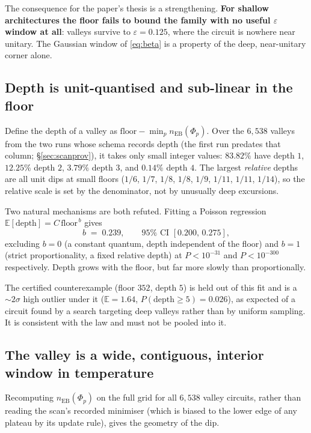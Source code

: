 \documentclass[11pt,a4paper]{article}
\theoremstyle{definition}
\theoremstyle{remark}
\newcommand{\nEB}{n_{\mathrm{EB}}}
\begin{document}
The consequence for the paper's thesis is a strengthening. \textbf{For shallow architectures the floor fails to bound the family with no useful $\varepsilon$ window at all}: valleys survive to $\varepsilon = 0.125$, where the circuit is nowhere near unitary. The Gaussian window of \eqref{eq:beta} is a property of the deep, near-unitary corner alone.

\subsection{Depth is unit-quantised and sub-linear in the floor}

Define the depth of a valley as $\mathrm{floor} - \min_p \nEB(\Phi_p)$. Over the $6{,}538$ valleys from the two runs whose schema records depth (the first run predates that column; \S\ref{sec:scanprov}), it takes only small integer values: $83.82\%$ have depth $1$, $12.25\%$ depth $2$, $3.79\%$ depth $3$, and $0.14\%$ depth $4$. The largest \emph{relative} depths are all unit dips at small floors ($1/6$, $1/7$, $1/8$, $1/8$, $1/9$, $1/11$, $1/11$, $1/14$), so the relative scale is set by the denominator, not by unusually deep excursions.

Two natural mechanisms are both refuted. Fitting a Poisson regression $\mathbb E[\text{depth}] = C\,\mathrm{floor}^{\,b}$ gives
\begin{equation}\label{eq:depthglm}
  b \;=\; 0.239, \qquad 95\% \text{ CI } [0.200,\, 0.275],
\end{equation}
excluding $b = 0$ (a constant quantum, depth independent of the floor) and $b = 1$ (strict proportionality, a fixed relative depth) at $P < 10^{-31}$ and $P < 10^{-300}$ respectively. Depth grows with the floor, but far more slowly than proportionally.

The certified counterexample (floor $352$, depth $5$) is held out of this fit and is a $\sim2\sigma$ high outlier under it ($\mathbb E = 1.64$, $P(\text{depth}\ge5) = 0.026$), as expected of a circuit found by a search targeting deep valleys rather than by uniform sampling. It is consistent with the law and must not be pooled into it.

\subsection{The valley is a wide, contiguous, interior window in temperature}\label{sec:window}

Recomputing $\nEB(\Phi_p)$ on the full grid for all $6{,}538$ valley circuits, rather than reading the scan's recorded minimiser (which is biased to the lower edge of any plateau by its update rule), gives the geometry of the dip.
\end{document}
